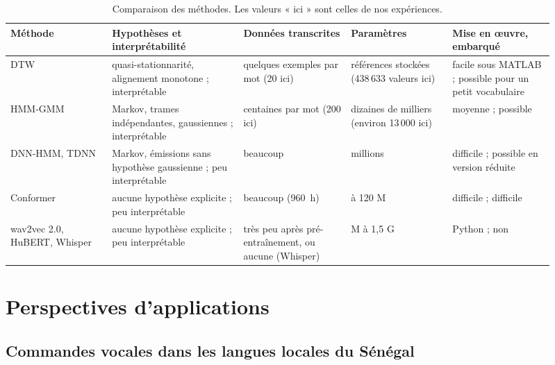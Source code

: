 \begin{table}[ht]
  \centering\footnotesize
  \renewcommand{\arraystretch}{1.2}
  \begin{tabular}{>{\raggedright\arraybackslash}p{0.17\linewidth}>{\raggedright\arraybackslash}p{0.22\linewidth}>{\raggedright\arraybackslash}p{0.18\linewidth}>{\raggedright\arraybackslash}p{0.17\linewidth}>{\raggedright\arraybackslash}p{0.17\linewidth}}
    \toprule
    Méthode & Hypothèses et interprétabilité & Données transcrites & Paramètres & Mise en œuvre, embarqué\\
    \midrule
    DTW & quasi-stationnarité, alignement monotone ; interprétable & quelques exemples par mot (20 ici) & références stockées (438\,633 valeurs ici) & facile sous MATLAB ; possible pour un petit vocabulaire\\
    HMM-GMM & Markov, trames indépendantes, gaussiennes ; interprétable & centaines par mot (200 ici) & dizaines de milliers (environ 13\,000 ici) & moyenne ; possible\\
    DNN-HMM, TDNN & Markov, émissions sans hypothèse gaussienne ; peu interprétable & beaucoup & millions & difficile ; possible en version réduite\\
    Conformer & aucune hypothèse explicite ; peu interprétable & beaucoup (960~h) & 10 à 120 M & difficile ; difficile\\
    wav2vec 2.0, HuBERT, Whisper & aucune hypothèse explicite ; peu interprétable & très peu après pré-entraînement, ou aucune (Whisper) & 95 M à 1,5 G & Python ; non\\
    \bottomrule
  \end{tabular}
  \caption{Comparaison des méthodes. Les valeurs « ici » sont celles de nos expériences.}
\end{table}

\section{Perspectives d'applications}

\subsection{Commandes vocales dans les langues locales du Sénégal}

